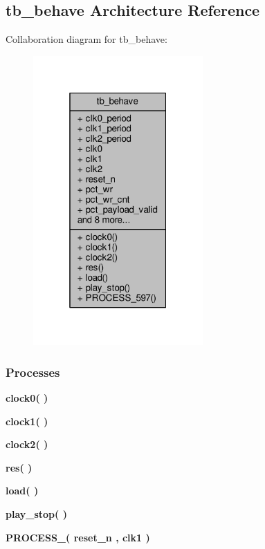 \subsection{tb\+\_\+behave Architecture Reference}
\label{classwfm__player__tb_1_1tb__behave}


Collaboration diagram for tb\+\_\+behave\+:\nopagebreak
\begin{figure}[H]
\begin{center}
\leavevmode
\includegraphics[width=184pt]{d9/d53/classwfm__player__tb_1_1tb__behave__coll__graph}
\end{center}
\end{figure}
\subsubsection*{Processes}
 \begin{DoxyCompactItemize}
\item 
{\bf clock0}{\bfseries  (  )}
\item 
{\bf clock1}{\bfseries  (  )}
\item 
{\bf clock2}{\bfseries  (  )}
\item 
{\bf res}{\bfseries  (  )}
\item 
{\bf load}{\bfseries  (  )}
\item 
{\bf play\+\_\+stop}{\bfseries  (  )}
\item 
{\bf P\+R\+O\+C\+E\+S\+S\+\_}{\bfseries  ( {\bfseries {\bfseries {\bf reset\+\_\+n}} \textcolor{vhdlchar}{ }} , {\bfseries {\bfseries {\bf clk1}} \textcolor{vhdlchar}{ }} )}
\end{DoxyCompactItemize}
